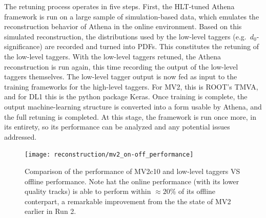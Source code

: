         The retuning process operates in five steps.
        First, the HLT-tuned Athena framework is run on a large sample of simulation-based data,
            which emulates the reconstruction behavior of Athena in the online environment.
        Based on this simulated reconstruction, the distributions used by the low-level taggers
            (e.g.\ $d_0$-significance) are recorded and turned into PDFs.
        This constitutes the retuning of the low-level taggers.
        With the low-level taggers retuned, the Athena reconstruction is run again,
            this time recording the output of the low-level taggers themselves.
        The low-level tagger output is now fed as input to the training frameworks for the high-level taggers.
        For MV2, this is ROOT's TMVA\cite{cern_root_tmva},
            and for DL1 this is the python package Keras\cite{keras}.
        Once training is complete, the output machine-learning structure is converted into a form usable by Athena,
            and the full retuning is completed.
        At this stage, the framework is run once more, in its entirety,
            so its performance can be analyzed and any potential issues addressed.

        \begin{figure}[tbh]
            \texttt{[image: reconstruction/mv2\_on-off\_performance]}
            \caption{
                Comparison of the performance of MV2c10 and low-level taggers VS offline performance\cite{Gupta:2271945}.
                Note hat the online performance (with its lower quality tracks) is able to perform within $\approx 20\%$
                    of its offline conterpart, a remarkable improvement from the the state of MV2 earlier in Run 2.
            }
            \label{fig:mv2_performance}
        \end{figure}


